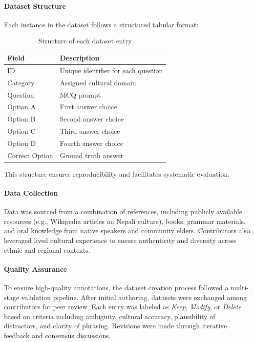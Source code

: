 \documentclass[10pt, a4paper]{article}
\begin{document}
\paragraph{Dataset Structure}
Each instance in the dataset follows a structured tabular format:

\begin{table}[h]
\centering
\begin{tabular}{|l|l|}
\hline
\textbf{Field} & \textbf{Description} \\
\hline
ID & Unique identifier for each question \\
Category & Assigned cultural domain \\
Question & MCQ prompt \\
Option A & First answer choice \\
Option B & Second answer choice \\
Option C & Third answer choice \\
Option D & Fourth answer choice \\
Correct Option & Ground truth answer \\
\hline
\end{tabular}
\caption{Structure of each dataset entry}
\label{tab:dataset_structure}
\end{table}

This structure ensures reproducibility and facilitates systematic evaluation.

\paragraph{Data Collection}
Data was sourced from a combination of references, including publicly available resources (e.g., Wikipedia articles on Nepali culture), books, grammar materials, and oral knowledge from native speakers and community elders. Contributors also leveraged lived cultural experience to ensure authenticity and diversity across ethnic and regional contexts.

\paragraph{Quality Assurance}
To ensure high-quality annotations, the dataset creation process followed a multi-stage validation pipeline. After initial authoring, datasets were exchanged among contributors for peer review. Each entry was labeled as \textit{Keep}, \textit{Modify}, or \textit{Delete} based on criteria including ambiguity, cultural accuracy, plausibility of distractors, and clarity of phrasing. Revisions were made through iterative feedback and consensus discussions.
\end{document}
